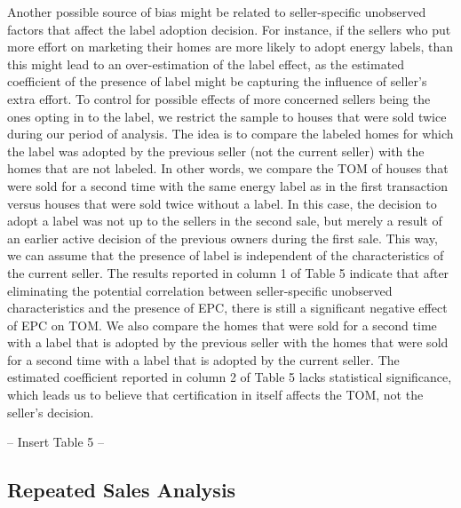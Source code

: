 \documentclass[12pt]{article}
\begin{document}
Another possible source of bias might be related to seller-specific unobserved factors that affect the label adoption decision. For instance, if the sellers who put more effort on marketing their homes are more likely to adopt energy labels, than this might lead to an over-estimation of the label effect, as the estimated coefficient of the presence of label might be capturing the influence of seller’s extra effort. To control for possible effects of more concerned sellers being the ones opting in to the label, we restrict the sample to houses that were sold twice during our period of analysis. The idea is to compare the labeled homes for which the label was adopted by the previous seller (not the current seller) with the homes that are not labeled. In other words, we compare the TOM of houses that were sold for a second time with the same energy label as in the first transaction versus houses that were sold twice without a label. In this case, the decision to adopt a label was not up to the  sellers in the second sale, but merely a result of an earlier active decision of the previous owners during the first sale. This way, we can assume that the presence of label is independent of the characteristics of the current seller. The results reported in column 1 of Table 5 indicate that after eliminating the potential correlation between seller-specific unobserved characteristics and the presence of EPC, there is still a significant negative effect of EPC on TOM. We also compare the homes that were sold for a second time with a label that is adopted by the previous seller with the homes that were sold for a second time with a label that is adopted by the current seller. The estimated coefficient reported in column 2 of Table 5 lacks statistical significance, which leads us to believe that certification in itself affects the TOM, not the seller's decision.

\begin{center}
-- Insert Table 5 --
\end{center}
\subsection{Repeated Sales Analysis}
\end{document}
